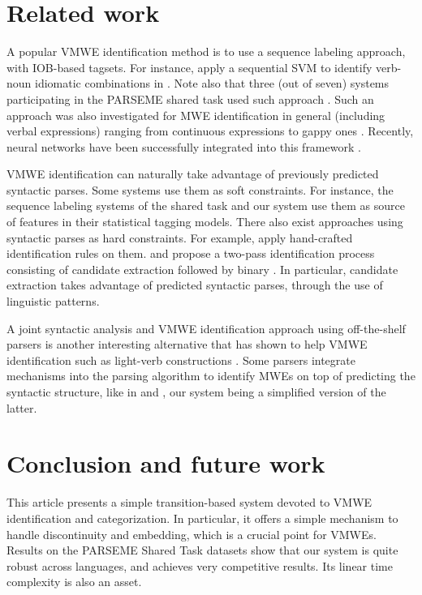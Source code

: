 \documentclass[output=paper,modfonts]{langscibook}
\begin{document}
\section{Related work}
A popular VMWE identification method is to use a sequence labeling approach, with IOB-based tagsets. For instance, \citet{diab-bhutada:2009:MWE09} apply a sequential SVM to identify verb-noun idiomatic combinations in . Note also that three (out of seven) systems participating in the PARSEME shared task used such approach \citep{borocs2017,maldonado2017,W17-1707}.
Such an approach was also investigated for MWE identification in general (including verbal expressions) ranging from continuous expressions \citep{blunsom-baldwin:2006:EMNLP} to gappy ones \citep{Schneider14b}. Recently, neural networks have been successfully integrated into this framework \citep{legrand2016phrase,W17-1707}. 

VMWE identification can naturally take advantage of previously predicted syntactic parses. Some systems use them as soft constraints. For instance, the sequence labeling systems of the shared task and our system use them as source of features in their statistical tagging models. There also exist approaches using syntactic parses as hard constraints. For example, \citet{Baptista:2015} apply hand-crafted identification rules on them.  \citet{fazly-cook-stevenson:2009:CL} and \citet{nagyt-vincze:2014:MWE} propose a two-pass identification process consisting of candidate extraction followed by binary . In particular, candidate extraction takes advantage of predicted syntactic parses, through the use of linguistic patterns. 

A joint syntactic analysis and VMWE identification approach using off-the-shelf parsers is another interesting alternative that has shown to help VMWE identification such as light-verb constructions \citep{Eryigit:2011:MES:2206359.2206365,Vincze:2010}. Some parsers integrate mechanisms into the parsing algorithm to identify MWEs on top of predicting the syntactic structure, like in \citet{Wehrli:2010} and \citet{constant-nivre:acl:2016}, our system being a simplified version of the latter.
\section{Conclusion and future work}
This article presents a simple transition-based system devoted to VMWE identification and categorization. In particular, it offers a simple mechanism to handle discontinuity and embedding, which is a crucial point for VMWEs.
Results on the PARSEME Shared Task datasets show that our system is quite robust across languages, and achieves very competitive results. Its linear time complexity is also an asset.
\end{document}
